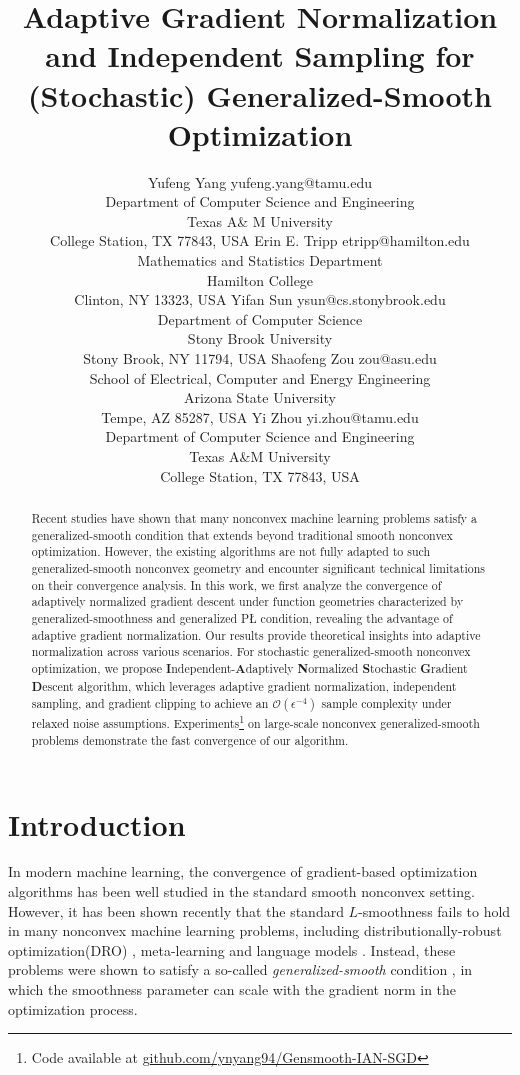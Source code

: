 \documentclass[10pt]{article} %
\title{Adaptive Gradient Normalization and Independent Sampling for (Stochastic) Generalized-Smooth Optimization}
\author{\name Yufeng Yang \email yufeng.yang@tamu.edu \\
      \addr Department of Computer Science and Engineering\\
      \addr Texas A\& M University\\
      \addr College Station, TX 77843, USA
      \AND
      \name Erin E. Tripp \email etripp@hamilton.edu \\
      \addr Mathematics and Statistics Department\\
      \addr Hamilton College\\
      \addr Clinton, NY 13323, USA
      \AND
      \name Yifan Sun \email ysun@cs.stonybrook.edu\\
      \addr Department of Computer Science\\
      \addr Stony Brook University \\
      \addr Stony Brook, NY 11794, USA
      \AND
      \name Shaofeng Zou \email 
      zou@asu.edu  \\
      \addr School of Electrical, Computer and Energy Engineering \\
      \addr Arizona State University \\
      \addr Tempe, AZ 85287, USA
      \AND
      \name Yi Zhou \email yi.zhou@tamu.edu \\
      \addr Department of Computer Science and Engineering\\
      \addr Texas A\&M University\\
      \addr College Station, TX 77843, USA
      }
\begin{document}
\maketitle

\begin{abstract}
Recent studies have shown that many nonconvex machine learning problems satisfy a generalized-smooth condition that extends beyond traditional smooth nonconvex optimization. However, the existing algorithms are not fully adapted to such generalized-smooth nonconvex geometry and encounter significant technical limitations on their convergence analysis. In this work, we first analyze the convergence of adaptively normalized gradient descent under function geometries characterized by generalized-smoothness and generalized P{\L} condition, revealing the advantage of adaptive gradient normalization. Our results provide theoretical insights into adaptive normalization across various scenarios.
For stochastic generalized-smooth nonconvex optimization, we propose \textbf{I}ndependent-\textbf{A}daptively \textbf{N}ormalized \textbf{S}tochastic \textbf{G}radient \textbf{D}escent algorithm, which leverages adaptive gradient normalization, independent sampling, and gradient clipping to achieve an $\mathcal{O}(\epsilon^{-4})$ sample complexity under relaxed noise assumptions. Experiments\footnote{Code available at \href{https://github.com/ynyang94/Gensmooth-IAN-SGD}{github.com/ynyang94/Gensmooth-IAN-SGD}} on large-scale nonconvex generalized-smooth problems demonstrate the fast convergence of our algorithm.
\end{abstract}

\section{Introduction}
In modern machine learning, the convergence of gradient-based optimization algorithms has been well studied in the standard smooth nonconvex setting.
However, it has been shown recently that the standard $L$-smoothness fails to hold in many nonconvex machine learning problems, including distributionally-robust optimization(DRO) \citep{levy2020large,jin2021nonconvex}, meta-learning \citep{firstordermeta,metagensmooth} and language models \citep{liu2021pretrain,zhang2020gradientclippingacceleratestraining}. Instead, these problems were shown to satisfy a so-called {\em generalized-smooth} condition \citep{zhang2020gradientclippingacceleratestraining}, in which the smoothness parameter can scale with the
gradient norm in the optimization process.
\end{document}

